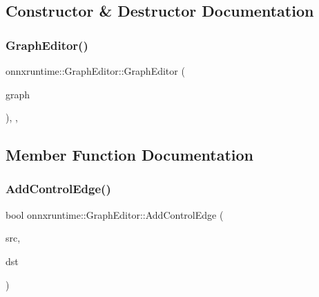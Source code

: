 \subsection{Constructor \& Destructor Documentation}
\mbox{\label{classonnxruntime_1_1GraphEditor_a9386ce2eda03c33519102ecd1b1eabbc}} 
\subsubsection{\texorpdfstring{Graph\+Editor()}{GraphEditor()}}
{\footnotesize\ttfamily onnxruntime\+::\+Graph\+Editor\+::\+Graph\+Editor (\begin{DoxyParamCaption}\item[{\mbox{\hyperlink{classonnxruntime_1_1Graph}{Graph}} \&}]{graph }\end{DoxyParamCaption})\hspace{0.3cm}{\ttfamily [inline]}, {\ttfamily [explicit]}, {\ttfamily [noexcept]}}



\subsection{Member Function Documentation}
\mbox{\label{classonnxruntime_1_1GraphEditor_ab8c53aca450ba7221343edb9c8f20926}} 
\subsubsection{\texorpdfstring{Add\+Control\+Edge()}{AddControlEdge()}}
{\footnotesize\ttfamily bool onnxruntime\+::\+Graph\+Editor\+::\+Add\+Control\+Edge (\begin{DoxyParamCaption}\item[{\mbox{\hyperlink{namespaceonnxruntime_af8773b5c12b5d8fd9292eb2e268df760}{Node\+Index}}}]{src,  }\item[{\mbox{\hyperlink{namespaceonnxruntime_af8773b5c12b5d8fd9292eb2e268df760}{Node\+Index}}}]{dst }\end{DoxyParamCaption})\hspace{0.3cm}{\ttfamily [inline]}}


